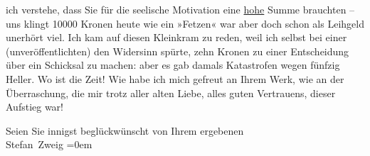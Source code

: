                ich verstehe, dass {\pb}Sie für die seelische
               Motivation eine \uline{hohe} Summe brauchten – uns klingt
               10000 Kronen heute wie ein »Fetzen« war aber doch schon als Leihgeld unerhört viel.
               Ich kam auf diesen Kleinkram zu reden, weil ich selbst bei einer (unveröffentlichten)
                  \label{K_L03669-4v}\label{K_L03669-4} den Widersinn spürte, zehn Kronen zu einer Entscheidung über
               ein Schicksal zu machen: aber es gab damals Katastrofen wegen fünfzig Heller. Wo ist
               die Zeit! Wie habe ich mich gefreut an Ihrem Werk, wie an der Überraschung, die mir trotz aller alten
               Liebe, alles guten Vertrauens, dieser Aufstieg war!\pend
           
\pstart
           Seien Sie innigst beglückwünscht von Ihrem ergebenen{\\[\baselineskip]}\spacefill\mbox{Stefan Zweig}\pend
           \leftskip=0em{}\endnumbering{}
\begin{anhang}
\end{anhang}
      